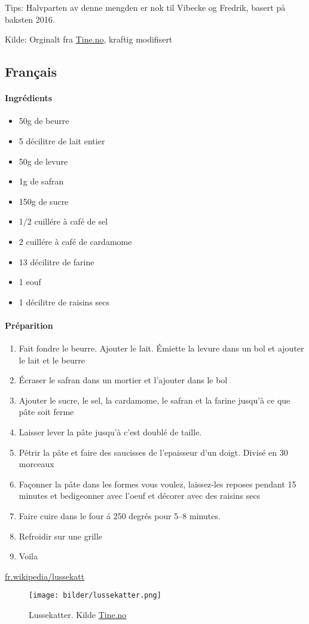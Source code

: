 Tips: Halvparten av denne mengden er nok til Vibecke og Fredrik, basert på baksten 2016.

Kilde: Orginalt fra \href{http://www.tine.no/oppskrifter/bakst/sot-gjarbakst/lussekatter}{Tine.no}, kraftig modifisert


\subsection{Français}
\paragraph{Ingrédients}
\begin{itemize}[noitemsep]
  \item 50g de beurre
  \item 5 décilitre de lait entier
  \item 50g de levure
  \item 1g de safran
  \item 150g de sucre
  \item 1/2 cuillére à café de sel
  \item 2 cuillére à café de cardamome
  \item 13 décilitre de farine
  \item 1 eouf
  \item 1 décilitre de raisins secs
\end{itemize}

\paragraph{Préparition}
\begin{enumerate}[noitemsep]
  \item Fait fondre le beurre. Ajouter le lait. Émiette la levure dans un bol et ajouter le lait et le beurre
  \item Écraser le safran dans un mortier et l'ajouter  dans le bol
  \item Ajouter le sucre, le sel, la cardamome, le safran et la farine jusqu'à ce que pâte soit ferme
  \item Laisser lever la pâte jusqu'à c'est doublé de taille.
  \item Pétrir la pâte et faire des saucisses de l'epaisseur d'un doigt. Divisé en 30 morceaux
  \item Façonner la pâte dans les formes vous voulez, laissez-les reposes pendant 15 minutes et bedigeonner avec l'oeuf et décorer avec des raisins secs
  \item Faire cuire dans le four á 250 degrés pour 5--8 minutes.
  \item Refroidir sur une grille
  \item Voila
\end{enumerate}


\href{https://fr.wikipedia.org/wiki/Lussekatt}{fr.wikipedia/lussekatt}


\begin{figure}[p]
\label{lussekatter}
  \texttt{[image: bilder/lussekatter.png]}
  \caption[Lussekatter]{Lussekatter. Kilde \href{http://www.tine.no/imageresize/383493_999_1150.png}{Tine.no}}
\end{figure}
